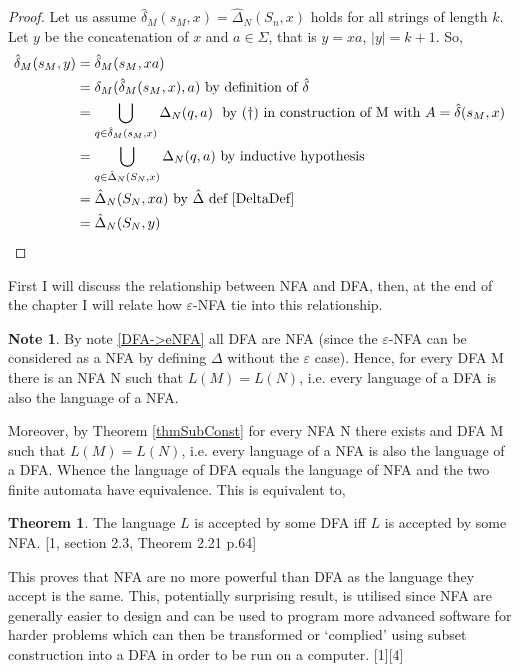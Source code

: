 \documentclass[a4paper,12pt]{report}
\theoremstyle{definition}
\newtheorem{theorem}{Theorem}[chapter]
\newtheorem{note}{Note}[subsection]
\begin{document}
\begin{proof}
Let us assume  $\hat{\delta}_M(s_M,x)=\hat{\Delta}_N(S_n,x)$ holds for all strings of length $k$. 
Let $y$ be the concatenation of $x$ and $a\in\Sigma$, that is $y=xa$, $|y|=k+1$. So,
\begin{align*}
   \hat{\delta}_M(s_M,y)&= \hat{\delta}_M(s_M,xa)\\
   &=\delta_M(\hat{\delta}_M(s_M,x),a) \ \text{by definition of $\hat{\delta}$} \\
   &=\bigcup\limits_{q\in\hat{\delta}_M(s_M,x)}\Delta_N(q,a) \ \text{ by ($\dagger$) in construction of M with }A=\hat{\delta}(s_M,x) \\
   &=\bigcup\limits_{q\in\hat{\Delta}_N(S_N,x)}\Delta_N(q,a) \ \text{by inductive hypothesis}\\
   &=\hat{\Delta}_N(S_N,xa) \ \text{by $\hat{\Delta}$ def \ref{DeltaDef}}\\
   &=\hat{\Delta}_N(S_N,y)
\end{align*}
\end{proof}

First I will discuss the relationship between NFA and DFA, then, at the end of the chapter I will relate how $\varepsilon$-NFA tie into this relationship. 

\begin{note}
By note \ref{DFA->eNFA} all DFA are NFA (since the $\varepsilon$-NFA can be considered as a NFA by defining $\Delta$ without the $\varepsilon$ case). Hence, for every DFA M there is an NFA N such that $L(M)=L(N)$, i.e. every language of a DFA is also the language of a NFA. 

Moreover,  by Theorem \ref{thmSubConst} for every NFA N there exists and DFA M such that $L(M)=L(N)$, i.e. every language of a NFA is also the language of a DFA. Whence the language of DFA equals the language of NFA and the two finite automata have equivalence.  This is equivalent to,
\end{note}  

\begin{theorem} 
\label{DFA=NFA}
The language $L$ is accepted by some DFA iff $L$ is accepted by some NFA.
[1, section 2.3, Theorem 2.21 p.64]
\end{theorem}

This proves that NFA are no more powerful than DFA as the language they accept is the same. This, potentially surprising result, is utilised since NFA are generally easier to design and can be used to program more advanced software for harder problems which can then be transformed or `complied' using subset construction into a DFA in order to be run on a computer. [1][4] 
\end{document}
